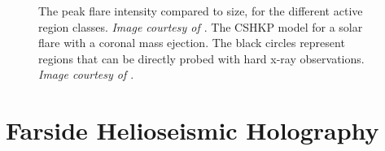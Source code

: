 \documentclass[11pt,a4paper,onecolumn]{report}
\begin{document}
\begin{figure}[t]%
  \centering
  \qquad
  \caption{ The peak flare intensity compared to
  size, for the different active region classes. \textit{Image courtesy of
  \citet{sammis_dependence_2000}}.  The CSHKP model for
  a solar flare with a coronal mass ejection. The black circles represent
  regions that can be directly probed with hard x-ray observations. \textit{Image
  courtesy of \citet{Christe2017}}.}
\end{figure}







\section{Farside Helioseismic Holography}
\label{sec:FHSM}
\end{document}
